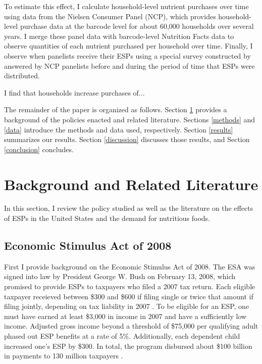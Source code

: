 \documentclass[12pt]{article}
\begin{document}
To estimate this effect, I calculate household-level nutrient purchases over time using data from the Nielsen Consumer Panel (NCP), which provides household-level purchase data at the barcode level for about 60,000 households over several years.
I merge these panel data with barcode-level Nutrition Facts data to observe quantities of each nutrient purchased per household over time.
Finally, I observe when panelists receive their ESPs using a special survey constructed by \textcite{broda2014economic} answered by NCP panelists before and during the period of time that ESPs were distributed.

I find that households increase purchases of...

The remainder of the paper is organized as follows.
Section \ref{background} provides a background of the policies enacted and related literature.
Sections \ref{methods} and \ref{data} introduce the methods and data used, respectively.
Section \ref{results} summarizes our results.
Section \ref{discussion} discusses those results, and Section \ref{conclusion} concludes.

\section{Background and Related Literature} \label{background}

In this section, I review the policy studied as well as the literature on the effects of ESPs in the United States and the demand for nutritious foods.

\subsection{Economic Stimulus Act of 2008} \label{2008esa}

First I provide background on the Economic Stimulus Act of 2008.
The ESA was signed into law by President George W.
Bush on February 13, 2008, which promised to provide ESPs to taxpayers who filed a 2007 tax return.
Each eligible taxpayer receieved between \$300 and \$600 if filing single or twice that amount if filing jointly, depending on tax liability in 2007 \parencite{house2008}.
To be eligible for an ESP, one must have earned at least \$3,000 in income in 2007 and have a sufficiently low income.
Adjusted gross income beyond a threshold of \$75,000 per qualifying adult phased out ESP benefits at a rate of 5\%.
Additionally, each dependent child increased one's ESP by \$300.
In total, the program disbursed about \$100 billion in payments to 130 million taxpayers \parencite{parker2013consumer}.
\end{document}
